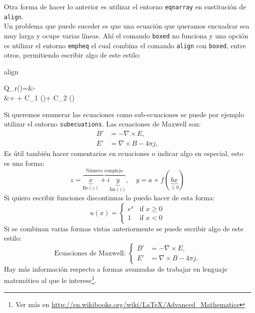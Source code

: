 \documentclass[a4paper,12pt]{article} %
\begin{document}
	Otra forma de hacer lo anterior es utilizar el entorno \verb|eqnarray| en sustitución de \verb|align|.\\
	
	Un problema que puede suceder es que una ecuación que queramos encuadrar sea muy larga y ocupe varias líneas. Ahí el comando \verb|boxed| no funciona y una opción es utilizar el entorno \verb|empheq| el cual combina el comando \verb|align| con \verb|boxed|, entre otros, permitiendo escribir algo de este estilo:
	\begin{empheq}[box=\fbox]{align}
	\begin{split}
	Q_r(\alpha)=&- \\
	 &+ + C_1 (\alpha)+ C_2 (\alpha)
	\label{eq:cortante_catenaria}
	\end{split}
	\end{empheq}
	
	Si queremos enumerar las ecuaciones como sub-ecuaciones se puede por ejemplo utilizar el entorno \verb|subecuations|. Las ecuaciones de Maxwell son:
	\begin{subequations}
		\begin{align}
	        B'&=-\nabla \times E,\\
	        E'&=\nabla \times B - 4\pi j,
	\end{align}
	\end{subequations}
	Es útil también hacer comentarios en ecuaciones o indicar algo en especial, esto es una forma:
	\begin{equation}
	 z = \overbrace{
	   \underbrace{x}_{\text{Re}(z)} + i\underbrace{y}_{\text{Im}(z)}
	  }^\text{Número complejo},
	\quad 
	 y = a + f(\underbrace{b x}_{
	                    \ge 0})
	\end{equation}
	Si quiero escribir funciones discontinuas lo puedo hacer de esta forma:
	\begin{equation}
	u(x) =
	  \begin{cases}
	   e^{x} & \text{if } x \geq 0 \\
	   1       & \text{if } x < 0
	  \end{cases}
	\end{equation}
	Si se combinan varias formas vistas anteriormente se puede escribir algo de este estilo:
	\begin{equation}
\text{Ecuaciones de Maxwell:}\,\,\begin{cases}
B'&=-\nabla \times E,\\
E'&=\nabla \times B - 4\pi j.
\end{cases}
	\end{equation}
	Hay más información respecto a formas avanzadas de trabajar en lenguaje matemático al que le interese\footnote{Ver más en \url{http://en.wikibooks.org/wiki/LaTeX/Advanced_Mathematics}}.
\end{document}
